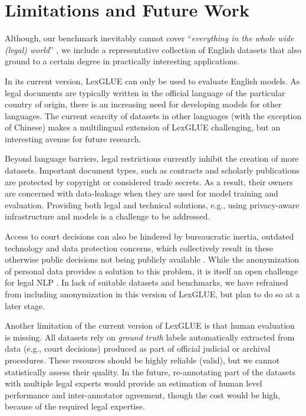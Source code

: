 \documentclass[11pt]{article}
\begin{document}
\section{Limitations and Future Work}
\label{sec:limitations}
Although, our benchmark inevitably cannot cover ``\emph{everything in the whole wide (legal) world}'' \cite{raji2021ai}, we include a representative collection of English datasets that also ground to a certain degree in practically interesting applications.

In its current version, LexGLUE can only be used to evaluate English models.
As legal documents are typically written in the official language of the particular country of origin, there is an increasing need for developing models for other languages.
The current scarcity of datasets in other languages (with the exception of Chinese) makes a multilingual extension of LexGLUE challenging, but an interesting avenue for future research. 

Beyond language barriers, legal restrictions currently inhibit the creation of more datasets. 
Important document types, such as contracts and scholarly publications are protected by copyright or considered trade secrets.
As a result, their owners are concerned with data-leakage when they are used for model training and evaluation.
Providing both legal and technical solutions, e.g., using privacy-aware infrastructure and models \cite{downie-2004-imirsel,feyisetan2020privacy} is a challenge to be addressed. 

Access to court decisions can also be hindered by bureaucratic inertia, outdated technology and data protection concerns, which collectively result in these otherwise public decisions not being publicly available \cite{pah2020build}. While the anonymization of personal data provides a solution to this problem, it is itself an open challenge for legal NLP \cite{jana2021investigation}. 
In lack of suitable datasets and benchmarks, we have refrained from including anonymization in this version of LexGLUE, but plan to do so at a later stage.

Another limitation of the current version of LexGLUE is that human evaluation is missing. All datasets rely on \emph{ground truth} labels automatically extracted from data (e.g., court decisions) produced as part of official judicial or archival procedures. These resources should be highly reliable (valid), but we cannot statistically assess their quality. In the future, re-annotating part of the datasets with multiple legal experts would provide an estimation of human level performance and inter-annotator agreement, though the cost would be high, because of the required legal expertise. 
\end{document}
